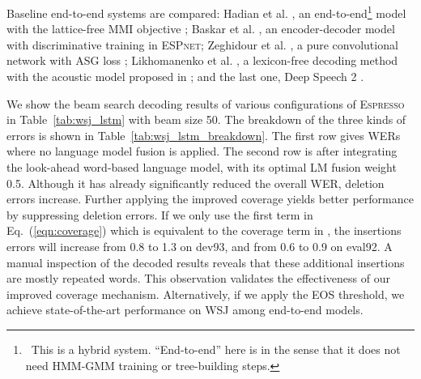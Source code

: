 \documentclass{article}
\def\espresso{\textsc{Espresso}\xspace}
\def\espnet{\textsc{ESPnet}\xspace}
\begin{document}
Baseline end-to-end systems are compared: Hadian et al. \cite{hadian2018end}, an end-to-end\footnote{~This is a hybrid system. ``End-to-end'' here is in the sense that it does not need HMM-GMM training or tree-building steps.} model with the lattice-free MMI objective \cite{povey2016purely}; Baskar et al. \cite{baskar2019promising}, an encoder-decoder model with discriminative training in \espnet; Zeghidour et al. \cite{zeghidour2018fully}, a pure convolutional network with ASG loss \cite{collobert2016wav2Letter}; Likhomanenko et al. \cite{Likhomanenko2019who}, a lexicon-free decoding method with the acoustic model proposed in \cite{zeghidour2018fully}; and the last one, Deep Speech 2 \cite{amodei2016deep}.

We show the beam search decoding results of various configurations of \espresso in Table~\ref{tab:wsj_lstm} with beam size 50. The breakdown of the three kinds of errors is shown in Table~\ref{tab:wsj_lstm_breakdown}. The first row gives WERs where no language model fusion is applied. The second row is after integrating the look-ahead word-based language model, with its optimal LM fusion weight 0.5. Although it has already significantly reduced the overall WER, deletion errors increase. Further applying the improved coverage yields better performance by suppressing deletion errors. 
If we only use the first term in Eq.~(\ref{eqn:coverage}) which is equivalent to the coverage term in \cite{chorowski2017towards}, the insertions errors will increase from 0.8 to 1.3 on dev93, and from 0.6 to 0.9 on eval92. A manual inspection of the decoded results reveals that these additional insertions are mostly repeated words. This observation validates the effectiveness of our improved coverage mechanism. Alternatively, if we apply the EOS threshold, we achieve state-of-the-art performance on WSJ among end-to-end models.
\end{document}
